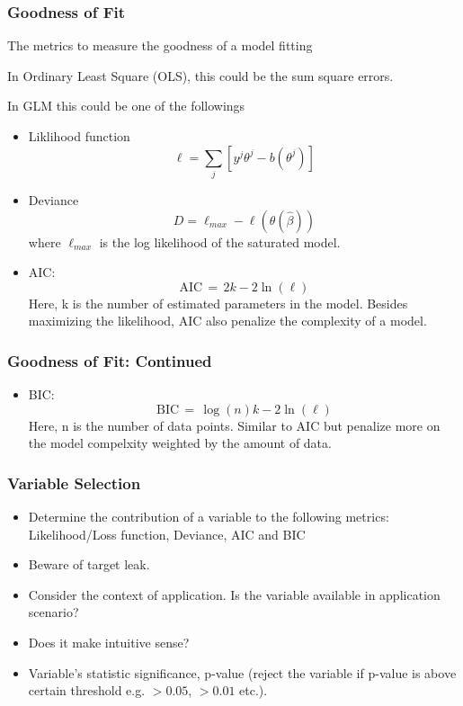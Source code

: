 \documentclass[notheorems, aspectratio=54, tikz,border=10pt,multi]{beamer}
\begin{document}
\begin{frame}
\frametitle{Goodness of Fit}

The metrics to measure the goodness of a model fitting

In Ordinary Least Square (OLS), this could be the sum square errors.

In GLM this could be one of the followings
\begin{itemize}
\item Liklihood function$$\ell=\sum_{j} \left[y^j\theta^j-b(\theta^j)\right]$$

\item Deviance $$D=\ell_{max}-\ell(\theta (\hat{\beta}))$$ where $\ell_{max}$ is the log likelihood of the saturated model.

\item AIC: $${\displaystyle \mathrm {AIC} \,=\,2k-2\ln({{\ell}})}$$
Here, k is the number of estimated parameters in the model. Besides maximizing the likelihood, AIC also penalize the complexity of a model.

\end{itemize}
\end{frame}

\begin{frame}
\frametitle{Goodness of Fit: Continued}
\begin{itemize}
\item BIC: $${\displaystyle \mathrm {BIC} \,=\,\log(n)k-2\ln({{\ell}})}$$
Here, n is the number of data points. Similar to AIC but penalize more on the model compelxity weighted by the amount of data.
\end{itemize}
\end{frame}

\begin{frame}
\frametitle{Variable Selection}
\begin{itemize}
\item Determine the contribution of a variable to the following metrics: Likelihood/Loss function, Deviance, AIC and BIC
\item Beware of target leak.
\item Consider the context of application. Is the variable available in application scenario?
\item Does it make intuitive sense?
\item Variable's statistic significance, p-value (reject the variable if p-value is above certain threshold e.g. $>0.05$, $>0.01$ etc.).
\end{itemize}
\end{frame}
\end{document}
